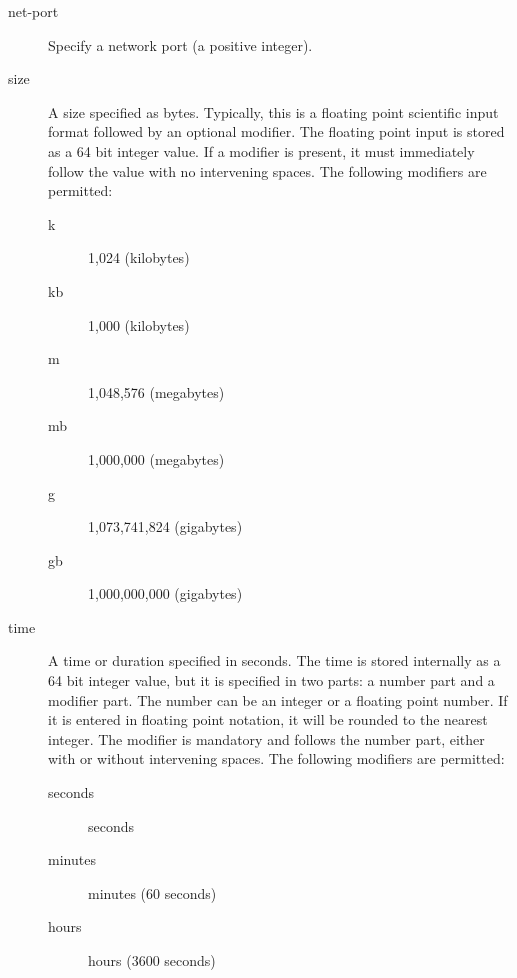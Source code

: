 \begin{description}
\item [net-port]
    \label{DataTypeNetPort}
    Specify a network port (a positive  integer).


\item [size]
    \label{DataTypeSize}
    \label{Size1}
A size specified as bytes. Typically, this is  a floating point scientific
input format followed by an optional modifier. The  floating point input is
stored as a 64 bit integer value.  If a modifier is present, it must
immediately follow the  value with no intervening spaces. The following
modifiers are permitted:

\begin{description}
\item [k]
   1,024 (kilobytes)

\item [kb]
   1,000 (kilobytes)

\item [m]
   1,048,576 (megabytes)

\item [mb]
   1,000,000 (megabytes)

\item [g]
   1,073,741,824 (gigabytes)

\item [gb]
   1,000,000,000 (gigabytes)
\end{description}


\item [time]
    \label{DataTypeTime}
    \label{Time}
A time or duration specified in seconds.  The time is stored internally as
a 64 bit integer value, but it is specified in two parts: a number part and
a modifier part.  The number can be an integer or a floating point number.
If it is entered in floating point notation, it will be rounded to the
nearest integer.  The modifier is mandatory and follows the number part,
either with or without intervening spaces.  The following modifiers are
permitted:

\begin{description}

\item [seconds]
   seconds

\item [minutes]
   minutes (60 seconds)

\item [hours]
   hours (3600 seconds)


\end{description}
\end{description}
